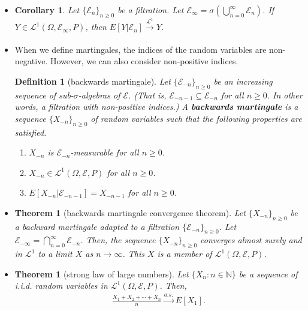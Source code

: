 \documentclass[10pt]{article}
\newtheorem{theorem}[lemma]{Theorem}
\newtheorem{definition}[lemma]{Definition}
\newtheorem{corollary}[lemma]{Corollary}
\numberwithin{lemma}{section}
\newcommand{\mcal}[1]{\mathcal{#1}}
\newcommand{\Nat}{\mathbb{N}}
\begin{document}
\begin{itemize}
\begin{theorem}[martingale convergence theorem \#2]
    Conversely, let $Y \in \mcal{L}^1(\Omega,\mcal{E},P)$. Consider the martingle $X_n = E[Y|\mcal{E}_n]$ that is closed by $Y$. Then, $\{ X_n \}_{n \geq 0}$ is a uniformly integrable collection of random variables.
  \end{theorem}

  \item \begin{corollary}
    Let $\{ \mcal{E}_n \}_{n \geq 0}$ be a filtration. Let $\mcal{E}_\infty = \sigma(\bigcup_{n=0}^\infty \mcal{E}_n)$. If $Y \in \mcal{L}^1(\Omega,\mcal{E}_\infty,P)$, then $E[Y|\mcal{E}_n] \xrightarrow[]{\mcal{L}^1} Y$.
  \end{corollary}

  \item When we define martingales, the indices of the random variables are non-negative. However, we can also consider non-positive indices.

  \begin{definition}[backwards martingale]
    Let $\{ \mcal{E}_{-n}\}_{n \geq 0}$ be an increasing sequence of sub-$\sigma$-algebras of $\mcal{E}$. (That is, $\mcal{E}_{-n-1} \subseteq \mcal{E}_{-n}$ for all $n \geq 0$. In other words, a filtration with non-positive indices.) A {\bf backwards martingale} is a sequence $\{ X_{-n} \}_{n \geq 0}$ of random variables such that the following properties are satisfied.
    \begin{enumerate}
      \item $X_{-n}$ is $\mcal{E}_{-n}$-measurable for all $n \geq 0$.
      \item $X_{-n} \in \mcal{L}^1(\Omega,\mcal{E},P)$ for all $n \geq 0$.
      \item $E[X_{-n}|\mcal{E}_{-n-1}] = X_{-n-1}$ for all $n \geq 0$.
    \end{enumerate}
    
  \end{definition}

  \item \begin{theorem}[backwards martingale convergence theorem]
    Let $\{ X_{-n}\}_{n \geq 0}$ be a backward martingale adapted to a filtration $\{ \mcal{E}_{-n} \}_{n \geq 0}$. Let $\mcal{E}_{-\infty} = \bigcap_{n=0}^\infty \mcal{E}_{-n}$. Then, the sequence $\{ X_{-n}\}_{n \geq 0}$ converges almost surely and in $\mcal{L}^1$ to a limit $X$ as $n \rightarrow \infty$. This $X$ is a member of $\mcal{L}^1(\Omega, \mcal{E}, P)$.
  \end{theorem}

  \item \begin{theorem}[strong law of large numbers]
    Let $\{ X_n : n \in \Nat \}$ be a sequence of i.i.d. random variables in $\mcal{L}^1(\Omega,\mcal{E},P)$. Then,
    \begin{align*}
      \frac{X_1 + X_2 + \dotsm + X_n}{n} \xrightarrow[]{a.s.} E[X_1].
    \end{align*}    
  \end{theorem}
\end{itemize}
\end{document}
